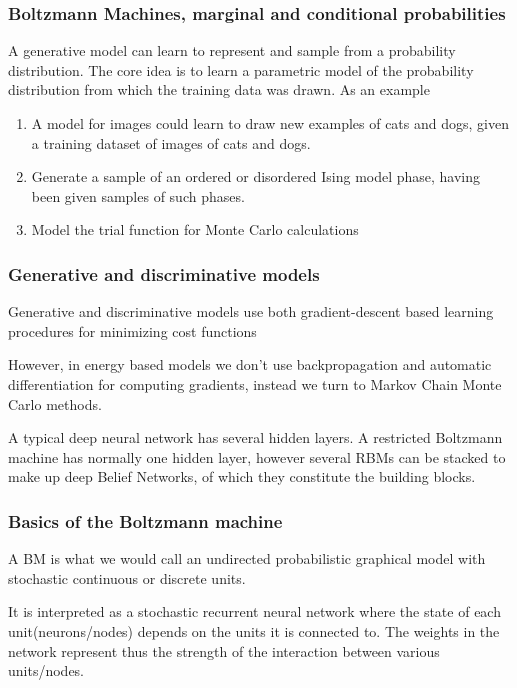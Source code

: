 \documentclass{beamer}
\begin{document}
\begin{frame}
\frametitle{Boltzmann Machines, marginal and conditional probabilities}

A generative model can learn to represent and sample from a
probability distribution. The core idea is to learn a parametric model
of the probability distribution from which the training data was
drawn. As an example
\begin{enumerate}
\item A model for images could learn to draw new examples of cats and dogs, given a training dataset of images of cats and dogs.

\item Generate a sample of an ordered or disordered Ising model phase, having been given samples of such phases.

\item Model the trial function for Monte Carlo calculations
\end{enumerate}

\noindent
\end{frame}

\begin{frame}
\frametitle{Generative and discriminative models}

Generative and discriminative models use both gradient-descent based
learning procedures for minimizing cost functions

However, in energy based models we don't use backpropagation and automatic
differentiation for computing gradients, instead we turn to Markov
Chain Monte Carlo methods.

A typical deep neural network has several hidden layers. A restricted
Boltzmann machine has normally one hidden layer, however several RBMs can
be stacked to make up deep Belief Networks, of which they constitute
the building blocks.
\end{frame}

\begin{frame}
\frametitle{Basics of the Boltzmann machine}

\begin{block}{}
A BM is what we would call an undirected probabilistic graphical model
with stochastic continuous or discrete units.
\end{block}
\begin{block}{}
It is interpreted as a stochastic recurrent neural network where the
state of each unit(neurons/nodes) depends on the units it is connected
to. The weights in the network represent thus the strength of the
interaction between various units/nodes.
\end{block}
\end{frame}
\end{document}
